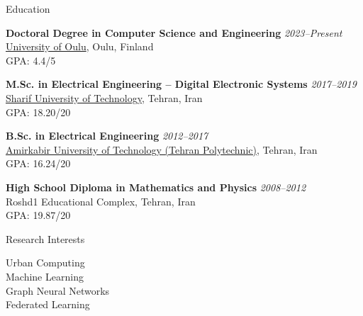\documentclass{resume}
\begin{document}

\begin{rSection}{Education}
\vspace{+.1cm}

{\bf Doctoral Degree in Computer Science and Engineering} \hfill {\em 2023--Present} \\
\href{https://www.oulu.fi/}{University of Oulu}, Oulu, Finland \\
GPA: 4.4/5

{\bf M.Sc. in Electrical Engineering -- Digital Electronic Systems} \hfill {\em 2017--2019} \\
\href{http://www.en.sharif.edu/}{Sharif University of Technology}, Tehran, Iran \\
GPA: 18.20/20

{\bf B.Sc. in Electrical Engineering} \hfill {\em 2012--2017} \\
\href{https://www.aut.ac.ir/en}{Amirkabir University of Technology (Tehran Polytechnic)}, Tehran, Iran \\
GPA: 16.24/20

{\bf High School Diploma in Mathematics and Physics} \hfill {\em 2008--2012} \\
Roshd1 Educational Complex, Tehran, Iran \\
GPA: 19.87/20

\end{rSection}


\begin{rSection}{Research Interests}
\vspace{+.1cm}

Urban Computing \\
Machine Learning \\
Graph Neural Networks \\
Federated Learning

\end{rSection}

\end{document}
